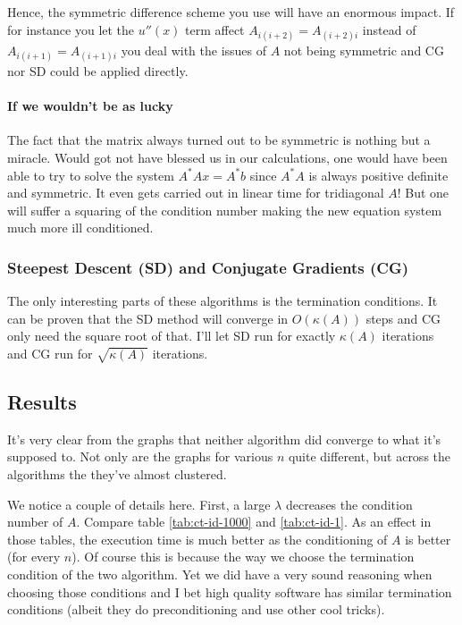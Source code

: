 \documentclass[a4paper,11pt]{article}
\begin{document}
Hence, the symmetric difference scheme you use will have an enormous
impact. If for instance you let the $u''(x)$ term affect
$A_{i(i+2)}=A_{(i+2)i}$ instead of $A_{i(i+1)}=A_{(i+1)i}$ you deal with
the issues of $A$ not being symmetric and CG nor SD could be applied
directly.

\paragraph{If we wouldn't be as lucky}

The fact that the matrix always turned out to be symmetric is nothing
but a miracle. Would got not have blessed us in our calculations, one
would have been able to try to solve the system $A^{*}Ax=A^{*}b$ since
$A^*A$ is always positive definite and symmetric.  It even gets carried
out in linear time for tridiagonal $A$! But one will suffer a squaring
of the condition number making the new equation system much more ill
conditioned.

\subsubsection{Steepest Descent (SD) and Conjugate Gradients (CG)}

The only interesting parts of these algorithms is the termination
conditions. It can be proven that the SD method will converge in
$O(\kappa(A))$ steps and CG only need the square root of that.
I'll let SD run for exactly $\kappa(A)$ iterations and CG run for
$\sqrt{\kappa(A)}$ iterations.

\subsection{Results}

It's very clear from the graphs that neither algorithm did converge to
what it's supposed to. Not only are the graphs for various $n$ quite
different, but across the algorithms the they've almost clustered.

We notice a couple of details here. First, a large $\lambda$ decreases the
condition number of $A$. Compare table \ref{tab:ct-id-1000} and
\ref{tab:ct-id-1}. As an effect in those tables, the execution time is
much better as the conditioning of $A$ is better (for every $n$). Of
course this is because the way we choose the termination condition of
the two algorithm. Yet we did have a very sound reasoning when choosing
those conditions and I bet high quality software has similar termination
conditions (albeit they do preconditioning and use other cool tricks).
\end{document}
